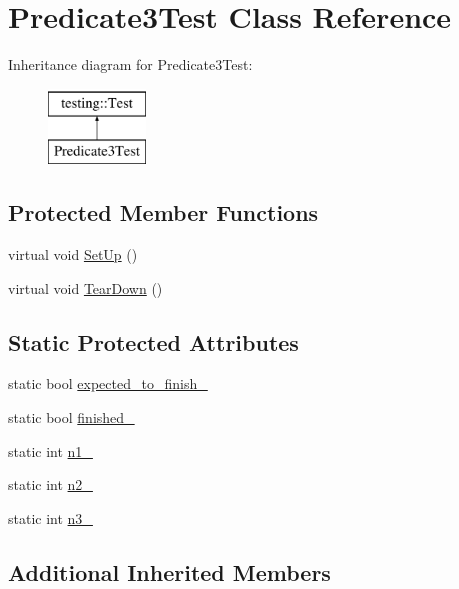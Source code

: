 \hypertarget{classPredicate3Test}{}\section{Predicate3\+Test Class Reference}
\label{classPredicate3Test}
Inheritance diagram for Predicate3\+Test\+:\begin{figure}[H]
\begin{center}
\leavevmode
\includegraphics[height=2.000000cm]{classPredicate3Test}
\end{center}
\end{figure}
\subsection*{Protected Member Functions}
\begin{DoxyCompactItemize}
\item 
virtual void \mbox{\hyperlink{classPredicate3Test_a92aad9566e0737b6739d1db14e7912be}{Set\+Up}} ()
\item 
virtual void \mbox{\hyperlink{classPredicate3Test_aa4dc395bded849b6e5175566d791aba7}{Tear\+Down}} ()
\end{DoxyCompactItemize}
\subsection*{Static Protected Attributes}
\begin{DoxyCompactItemize}
\item 
static bool \mbox{\hyperlink{classPredicate3Test_a42c11555410ee89bf6e59d39336a212c}{expected\+\_\+to\+\_\+finish\+\_\+}}
\item 
static bool \mbox{\hyperlink{classPredicate3Test_aa2ef0fa6aed09d872fb9ae36961b49eb}{finished\+\_\+}}
\item 
static int \mbox{\hyperlink{classPredicate3Test_ac232320a93f0c1e09886148a3e1929a5}{n1\+\_\+}}
\item 
static int \mbox{\hyperlink{classPredicate3Test_a11049ef16bcaadc8262faf7349c7676e}{n2\+\_\+}}
\item 
static int \mbox{\hyperlink{classPredicate3Test_afc1df6b079ffe22b87479b161d2ad2f7}{n3\+\_\+}}
\end{DoxyCompactItemize}
\subsection*{Additional Inherited Members}


